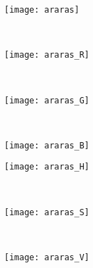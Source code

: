 \begin{figure}[!ht]
    \begin{subfigure}[t]{\textwidth+20pt\relax}
    	\texttt{[image: araras]}
    \end{subfigure} \\    
     
    \begin{subfigure}[t]{\textwidth+20pt\relax}
    	\texttt{[image: araras\_R]}
    \end{subfigure}      
    ~ %
    \begin{subfigure}[b]{0.3\textwidth}
        \texttt{[image: araras\_G]}
    \end{subfigure}
    ~ %
    \begin{subfigure}[b]{0.3\textwidth}
        \texttt{[image: araras\_B]}
    \end{subfigure} \vspace{5pt}      
    
    \begin{subfigure}[t]{\textwidth+20pt\relax}
    	\texttt{[image: araras\_H]}
    \end{subfigure}     
    ~ %
    \begin{subfigure}[b]{0.3\textwidth}
        \texttt{[image: araras\_S]}
    \end{subfigure}
    ~ %
    \begin{subfigure}[b]{0.3\textwidth}
        \texttt{[image: araras\_V]}
    \end{subfigure} \vspace{5pt}  
        

\end{figure}
